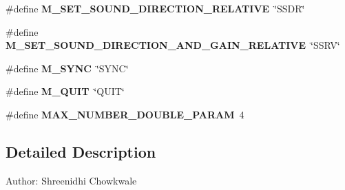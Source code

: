 \begin{CompactItemize}
\item 
\#define \textbf{M\_\-SET\_\-SOUND\_\-DIRECTION\_\-RELATIVE}~\char`\"{}SSDR\char`\"{}\label{OASMessage_8h_9310a68a2910dea7e37d76334be77ec5}

\item 
\#define \textbf{M\_\-SET\_\-SOUND\_\-DIRECTION\_\-AND\_\-GAIN\_\-RELATIVE}~\char`\"{}SSRV\char`\"{}\label{OASMessage_8h_958475295974d67b754d1ec63a71570a}

\item 
\#define \textbf{M\_\-SYNC}~\char`\"{}SYNC\char`\"{}\label{OASMessage_8h_e5c62ccdd36d455d4a0fc51c77650775}

\item 
\#define \textbf{M\_\-QUIT}~\char`\"{}QUIT\char`\"{}\label{OASMessage_8h_33aa433c65222f9dfc7a4746e8d36ed2}

\item 
\#define \textbf{MAX\_\-NUMBER\_\-DOUBLE\_\-PARAM}~4\label{OASMessage_8h_12b2de3e79c3ff8081ae2b2ab7dfc3a9}

\end{CompactItemize}


\subsection{Detailed Description}
\begin{Desc}
\item[Author:]Shreenidhi Chowkwale \end{Desc}
